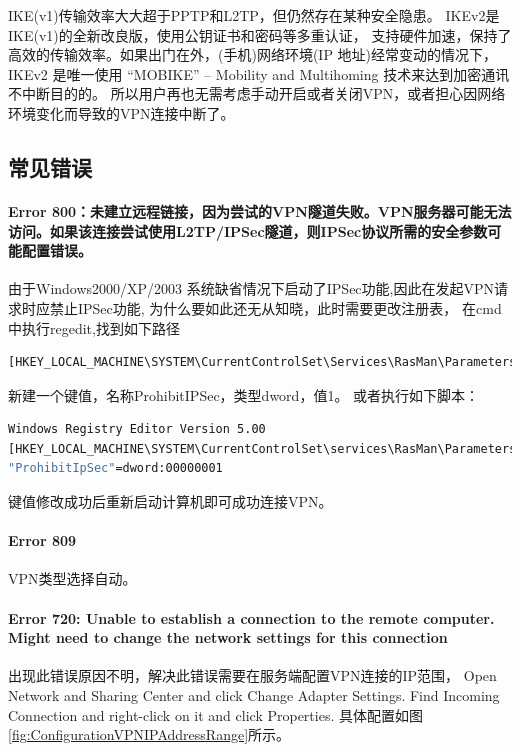 \documentclass{book}
\begin{document}
IKE(v1)传输效率大大超于PPTP和L2TP，但仍然存在某种安全隐患。
IKEv2是IKE(v1)的全新改良版，使用公钥证书和密码等多重认证，
支持硬件加速，保持了高效的传输效率。如果出门在外，(手机)网络环境(IP 地址)经常变动的情况下，
IKEv2 是唯一使用 “MOBIKE” – Mobility and Multihoming 技术来达到加密通讯不中断目的的。
所以用户再也无需考虑手动开启或者关闭VPN，或者担心因网络环境变化而导致的VPN连接中断了。

\subsection{常见错误}

\paragraph{Error 800：未建立远程链接，因为尝试的VPN隧道失败。VPN服务器可能无法访问。如果该连接尝试使用L2TP/IPSec隧道，则IPSec协议所需的安全参数可能配置错误。}
由于Windows2000/XP/2003 系统缺省情况下启动了IPSec功能,因此在发起VPN请求时应禁止IPSec功能,
为什么要如此还无从知晓，此时需要更改注册表，
在cmd中执行regedit,找到如下路径
\begin{lstlisting}
[HKEY_LOCAL_MACHINE\SYSTEM\CurrentControlSet\Services\RasMan\Parameters]
\end{lstlisting}

新建一个键值，名称ProhibitIPSec，类型dword，值1。
或者执行如下脚本：

\begin{lstlisting}[language=Bash]
Windows Registry Editor Version 5.00
[HKEY_LOCAL_MACHINE\SYSTEM\CurrentControlSet\services\RasMan\Parameters]
"ProhibitIpSec"=dword:00000001
\end{lstlisting} 

键值修改成功后重新启动计算机即可成功连接VPN。

\paragraph{Error 809}VPN类型选择自动。

\paragraph{Error 720: Unable to establish a connection to the remote computer. Might need to change the network settings for this connection}

出现此错误原因不明，解决此错误需要在服务端配置VPN连接的IP范围，
Open Network and Sharing Center and click Change Adapter Settings.
Find Incoming Connection and right-click on it and click Properties.
具体配置如图\ref{fig:ConfigurationVPNIPAddressRange}所示。
\end{document}
